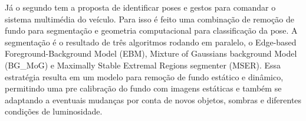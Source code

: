 Já o segundo tem a proposta de identificar poses e gestos para comandar o sistema multimédia do veículo. Para isso é feito uma combinação de remoção de fundo para segmentação e geometria computacional para classificação da pose. A segmentação é o resultado de três algoritmos rodando em paralelo, o Edge-based Foreground-Background Model (EBM), Mixture of Gaussians background Model (BG\_MoG) e Maximally Stable Extremal Regions segmenter (MSER). Essa estratégia resulta em um modelo para remoção de fundo estático e dinâmico, permitindo uma pre calibração do fundo com imagens estáticas e também se adaptando a eventuais mudanças por conta de novos objetos, sombras e diferentes condições de luminosidade.